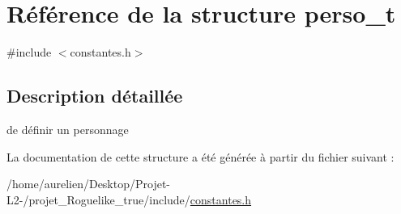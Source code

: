 \hypertarget{structperso__t}{}\section{Référence de la structure perso\+\_\+t}
\label{structperso__t}


{\ttfamily \#include $<$constantes.\+h$>$}



\subsection{Description détaillée}
de définir un personnage 

La documentation de cette structure a été générée à partir du fichier suivant \+:\begin{DoxyCompactItemize}
\item 
/home/aurelien/\+Desktop/\+Projet-\/\+L2-\//projet\+\_\+\+Roguelike\+\_\+true/include/\hyperlink{constantes_8h}{constantes.\+h}\end{DoxyCompactItemize}
